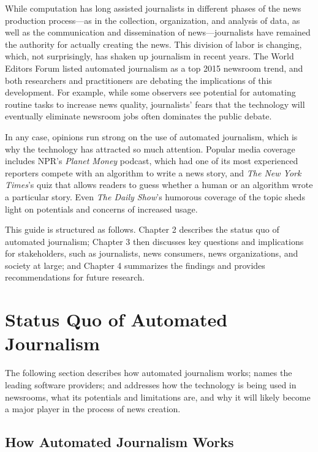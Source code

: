 \documentclass[notoc, symmetric, nobib, nols]{towcenter-guideto-book}
\begin{document}
While computation has long assisted journalists in different phases of the news production process---as in the collection, organization, and analysis of data, as well as the communication and dissemination of news---journalists have remained the authority for actually creating the news. This division of labor is changing, which, not surprisingly, has shaken up journalism in recent years. The World Editors Forum listed automated journalism as a top 2015 newsroom trend,\autocite{ap15} and both researchers and practitioners are debating the implications of this development.\autocites{napoli14,diak15,anderson13} For example, while some observers see potential for automating routine tasks to increase news quality, journalists' fears that the technology will eventually eliminate newsroom jobs often dominates the public debate.\autocite{dalen12,carlson15}  

In any case, opinions run strong on the use of automated journalism, which is why the technology has attracted so much attention. Popular media coverage includes NPR's \textit{Planet Money} podcast, which had one of its most experienced reporters compete with an algorithm to write a news story,\autocite{vs15} and \textit{The New York Times}'s quiz that allows readers to guess whether a human or an algorithm wrote a particular story.\autocite{nyt15} Even \textit{The Daily Show}'s humorous coverage of the topic sheds light on potentials and concerns of increased usage\autocite{daily15}.

This guide is structured as follows. Chapter 2 describes the status quo of automated journalism; Chapter 3 then discusses key questions and implications for stakeholders, such as journalists, news consumers, news organizations, and society at large; and Chapter 4 summarizes the findings and provides recommendations for future research.
 
\chapter{Status Quo of Automated Journalism}

The following section describes how automated journalism works; names the leading software providers; and addresses how the technology is being used in newsrooms, what its potentials and limitations are, and why it will likely become a major player in the process of news creation.

\section{How Automated Journalism Works}
\end{document}
